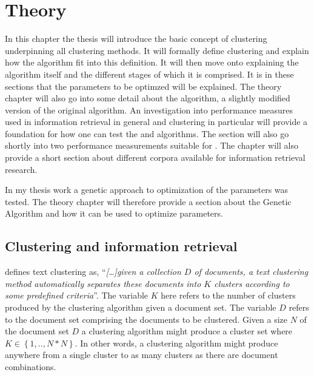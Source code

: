 
\chapter{Theory} %
\label{Theory} %

In this chapter the thesis will introduce the basic concept of clustering underpinning all clustering methods. It will formally define clustering and explain how the \STC algorithm fit into this definition. It will then move onto explaining the \STC algorithm itself and the different stages of which it is comprised. It is in these sections that the parameters to be optimzed will be explained. The theory chapter will also go into some detail about the \CTC algorithm, a slightly modified version of the original \STC algorithm. An investigation into performance measures used in information retrieval in general and clustering in particular will provide a foundation for how one can test the \STC and \CTC algorithms. The section will also go shortly into two performance measurements suitable for \CTC. The chapter will also provide a short section about different corpora available for information retrieval research.

In my thesis work a genetic approach to optimization of the parameters was tested. The theory chapter will therefore provide a section about the Genetic Algorithm and how it can be used to optimize parameters.

\section{Clustering and information retrieval}
\label{Clustering}
\citeauthor{Baeza-Yates2011a} defines text clustering as, ``\textit{[\dots]given a collection \(D\) of documents, a text clustering method automatically separates these documents into \(K\) clusters according to some predefined criteria}''. The variable \(K\) here refers to the number of clusters produced by the clustering algorithm given a document set. The variable \(D\) refers to the document set comprising the documents to be clustered. Given a size \(N\) of the document set \(D\) a clustering algorithm might produce a cluster set where \(K \in \left\{1, .., N*N\right\}\). In other words, a clustering algorithm might produce anywhere from a single cluster to as many clusters as there are document combinations.


